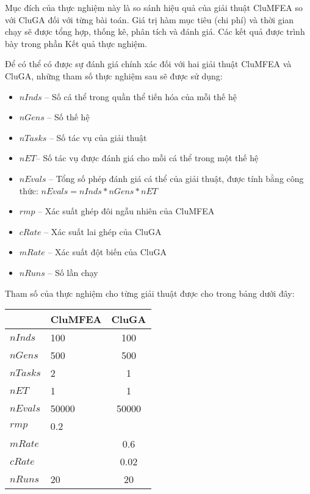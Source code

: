 Mục đích của thực nghiệm này là so sánh hiệu quả của giải thuật CluMFEA so với CluGA đối với từng bài toán. Giá trị hàm mục tiêu (chi phí) và thời gian chạy sẽ được tổng hợp, thống kê, phân tích và đánh giá. Các kết quả được trình bày trong phần Kết quả thực nghiệm.

Để có thể có được sự đánh giá chính xác đối với hai giải thuật CluMFEA và CluGA, những tham số thực nghiệm sau sẽ được sử dụng:
\begin{itemize}
	\item 	$nInds$ – Số cá thể trong quần thể tiến hóa của mỗi thế hệ
	\item $nGens$ – Số thế hệ
	\item $nTasks$ – Số tác vụ của giải thuật
	\item $nET$– Số tác vụ được đánh giá cho mỗi cá thể trong một thế hệ
	\item $nEvals$ – Tổng số phép đánh giá cá thể của giải thuật, được tính bằng công thức: $nEvals=nInds* nGens *nET$
	\item $rmp$ – Xác suất ghép đôi ngẫu nhiên của CluMFEA
	\item $cRate$ – Xác suất lai ghép của CluGA
	\item $mRate$ – Xác suất đột biến của CluGA
	\item $nRuns$ – Số lần chạy
\end{itemize}



Tham số của thực nghiệm cho từng giải thuật được cho trong bảng dưới đây:
\begin{center}
	\begin{tabular}{p{4.8cm} p{5.3cm} c}	
		\hline 
			 & CluMFEA & CluGA \\ 
		\hline 
		$nInds$	 & 100 & 100 \\ 
		\hline
		$nGens$ & 500 & 500 \\
		\hline 
		$nTasks$ & 2 & 1 \\
		\hline
		$nET$ & 1 & 1 \\
		\hline 
		$nEvals$ & 50000 & 50000 \\ 
		\hline 
		$rmp$ & 0.2 & \\ 
		\hline 
		$mRate$ & & 0.6 \\ 
		\hline 
		$cRate$ & & 0.02 \\  
		\hline 
		$nRuns$ & 20 & 20 \\
		\hline
	\end{tabular} 
\end{center} 
  
